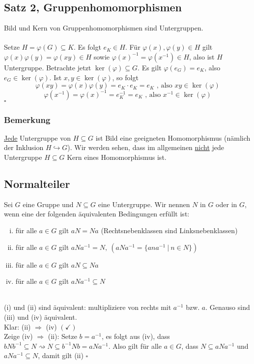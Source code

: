 \subsection{Satz 2, Gruppenhomomorphismen}
\label{sub:satz_ghm}
Bild und Kern von Gruppenhomomorphismen sind Untergruppen.\\

\\
Setze $H=\varphi(G)\subseteq K$. Es folgt $e_K \in H$. Für $\varphi(x),\varphi(y)\in H$ gilt $\varphi(x)\varphi(y)=\varphi(xy)\in H$ sowie $\varphi(x)^{-1}=\varphi(x^{-1}) \in H$, also ist $H$ Untergruppe. Betrachte jetzt $\ker(\varphi)\subseteq G$. Es gilt $\varphi(e_G)=e_K$, also $e_G \in \ker(\varphi)$. Ist $x,y \in \ker(\varphi)$, so folgt 
\[\varphi(xy)=\varphi(x)\varphi(y)=e_K \cdot e_K=e_K \text{ , also } xy \in \ker(\varphi)\]
\[\varphi(x^{-1})=\varphi(x)^{-1}=e_K^{-1}=e_K \text{ , also } x^{-1} \in \ker(\varphi) \]
\hfill $\square$

\subsubsection*{Bemerkung}
\uline{Jede} Untergruppe von $H\subseteq G$ ist Bild eine geeigneten Homomorphismus (nämlich der Inklusion $H \hookrightarrow G$). Wir werden sehen, dass im allgemeinen \uline{nicht} jede Untergruppe $H\subseteq G$ Kern eines Homomorphismus ist.

\subsection{Normalteiler}
\label{sub:normalteiler}
Sei $G$ eine Gruppe und $N\subseteq G$ eine Untergruppe. Wir nennen $N$  in $G$ oder  in $G$, wenn eine der folgenden äquivalenten Bedingungen erfüllt ist:
\begin{enumerate}[(i)]
	\item für alle $a\in G$ gilt $aN=Na$ (Rechtsnebenklassen sind Linksnebenklassen)
	\item für alle $a\in G$ gilt $aNa^{-1}=N,~ (aNa^{-1}=\{ana^{-1}~|~n\in N \})$
	\item für alle $a\in G$ gilt $aN\subseteq Na$
	\item für alle $a\in G$ gilt $aNa^{-1}\subseteq N$
\end{enumerate}

\\
(i) und (ii) sind äquivalent: multipliziere von rechts mit $a^{-1}$ bzw. $a$. Genauso sind (iii) und (iv) äquivalent.\\
Klar: (ii) $\Rightarrow$ (iv) $(\checkmark)$\\
Zeige (iv) $\Rightarrow$ (ii): Setze $b=a^{-1}$, es folgt aus (iv), dass $bNb^{-1}\subseteq N \rightsquigarrow N\subseteq b^{-1}Nb=aNa^{-1}$. Also gilt für alle $a\in G$, dass $N\subseteq aNa^{-1}$ und $aNa^{-1}\subseteq N$, damit gilt (ii)
\hfill $\square$

